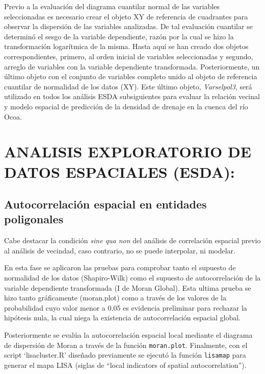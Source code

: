 \documentclass[11pt,]{article}
\begin{document}
Previo a la evaluación del diagrama cuantilar normal de las variables
seleccionadas es necesario crear el objeto XY de referencia de
cuadrantes para observar la dispersión de las variables analizadas. De
tal evaluación cuantilar se determinó el sesgo de la variable
dependiente, razón por la cual se hizo la transformación logarítmica de
la misma. Hasta aquí se han creado dos objetos correspondientes,
primero, al orden inicial de variables seleccionadas y segundo, arreglo
de variables con la variable dependiente transformada. Posteriormente,
un último objeto con el conjunto de variables completo unido al objeto
de referencia cuantilar de normalidad de los datos (XY). Este último
objeto, \emph{Varselpol3}, será utilizado en todos los análisis ESDA
subsiguientes para evaluar la relación vecinal y modelo espacial de
predicción de la densidad de drenaje en la cuenca del río Ocoa.

\section{ANALISIS EXPLORATORIO DE DATOS ESPACIALES
(ESDA):}\label{analisis-exploratorio-de-datos-espaciales-esda}

\subsection{Autocorrelación espacial en entidades
poligonales}\label{autocorrelaciuxf3n-espacial-en-entidades-poligonales}

Cabe destacar la condición \emph{sine qua non} del análisis de
correlación espacial previo al análisis de vecindad, caso contrario, no
se puede interpolar, ni modelar.

En esta fase se aplicaron las pruebas para comprobar tanto el supuesto
de normalidad de los datos (Shapiro-Wilk) como el supuesto de
autocorrelación de la variable dependiente transformada (I de Moran
Global). Esta ultima prueba se hizo tanto gráficamente (moran.plot) como
a través de los valores de la probabilidad cuyo valor menor a 0.05 es
evidencia preliminar para rechazar la hipótesis nula, la cual niega la
existencia de autocorrelación espacial global.

Posteriormente se evalúa la autocorrelación espacial local mediante el
diagrama de dispersión de Moran a través de la función
\texttt{moran.plot}. Finalmente, con el script `lisacluster.R' diseñado
previamente se ejecutó la función \texttt{lisamap} para generar el mapa
LISA (siglas de ``local indicators of spatial autocorrelation'').
\end{document}
